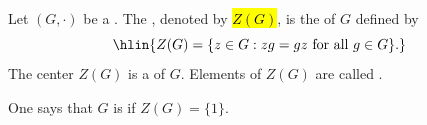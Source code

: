 \begin{definition} \label{definition:center_of_a_group}
Let $(G,\cdot)$ be a .
The , denoted by \hl{$Z(G)$}, is the  of $G$ defined by
$$\hlin{Z(G) = \{ z \in G : zg = gz \text{ for all } g \in G \}.}$$
The center $Z(G)$ is a  of $G$.
Elements of $Z(G)$ are called .

One says that $G$ is  if $Z(G) = \{1\}$.
\end{definition}